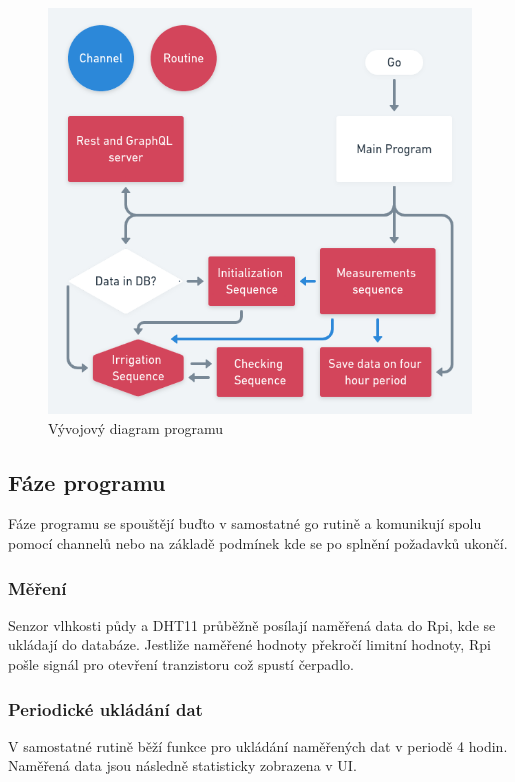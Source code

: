 \documentclass[12pt,a4paper]{article}
\begin{document}
\begin{figure}[h]
	\centering
	\includegraphics[width=0.9\linewidth]{go.png}
	\caption{Vývojový diagram programu}
\end{figure}

\subsection{Fáze programu}

Fáze programu se spouštějí buďto v samostatné go rutině a komunikují spolu
pomocí channelů nebo na základě podmínek kde se po splnění požadavků ukončí.

\subsubsection{Měření}

Senzor vlhkosti půdy a DHT11 průběžně posílají naměřená data do Rpi, kde se
ukládají do databáze. Jestliže naměřené hodnoty překročí limitní hodnoty, Rpi
pošle signál pro otevření tranzistoru což spustí čerpadlo.

\subsubsection{Periodické ukládání dat}

V samostatné rutině běží funkce pro ukládání naměřených dat v periodě 4 hodin.
Naměřená data jsou následně statisticky zobrazena v UI.
\end{document}
